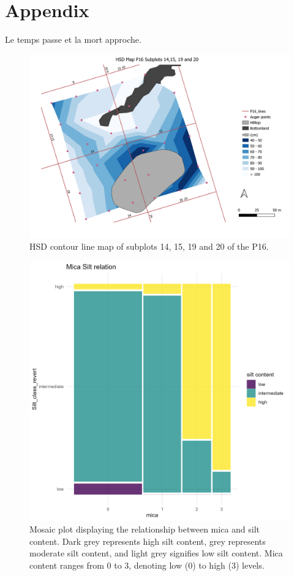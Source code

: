 \documentclass[fleqn,12pt]{latex/stylish_article} %
\begin{document}
\hypertarget{appendix}{%
\section{Appendix}\label{appendix}}

Le temps passe et la mort approche.

\break



\scriptsize

\begin{figure}

{\centering \includegraphics[width=0.6\linewidth]{images/HSD_MapwithBFandPL} 

}

\caption{HSD contour line map of subplots 14, 15, 19 and 20 of the P16.}\label{fig:HSDMapwithBFandPL}
\end{figure}

\normalsize



\scriptsize

\begin{figure}

{\centering \includegraphics[width=0.6\linewidth]{images/augerPlot_micaCor} 

}

\caption{Mosaic plot displaying the relationship between mica and silt content. Dark grey represents high silt content, grey represents moderate silt content, and light grey signifies low silt content. Mica content ranges from 0 to 3, denoting low (0) to high (3) levels.}\label{fig:augerPlotmicaCor}
\end{figure}
\end{document}
